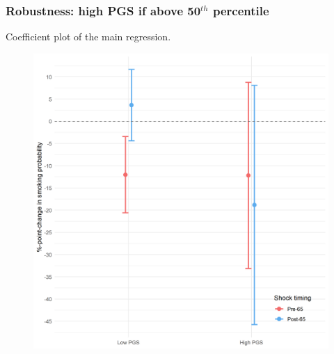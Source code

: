 \documentclass[10pt,compress,xcolor=dvipsnames,aspectratio=169]{beamer}    %
\newcounter{ex}
\newcommand{\1}[1]{\mathrm{1\hspace*{-2.5pt}l}[#1]}	%
\begin{document}
\begin{frame}
\frametitle{Robustness: high PGS if above 50$^{th}$ percentile}
Coefficient plot of the main regression.
\begin{figure}[hbtp]
\centering
\includegraphics[height=0.8\textheight]{../../3_output/shock_effects/robustness_6070__50pt_cvplot.png}
\label{fig:coeffplot50highPGS}
\end{figure}
\hyperlink{frame:robustness}{}
\end{frame}
\end{document}
